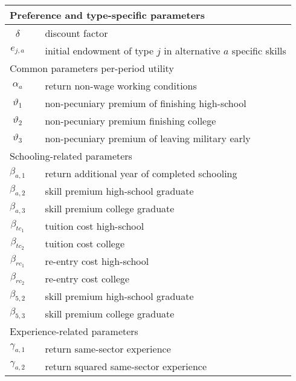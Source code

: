 \begin{ThreePartTable}
\begin{longtable}{@{}cll@{}}
\midrule
\multicolumn{3}{l}{Preference and type-specific parameters}																		 \\ \midrule 
$\delta$ 				&  & discount factor																			  \\
$e_{j, a}$			&  & initial endowment of type $j$ in alternative $a$ specific skills 	  \\ [7.5pt] \midrule 
\multicolumn{3}{l}{Common parameters per-period utility}												\\ \midrule 
$\alpha_a$           &  & return non-wage working conditions		   \\
$\vartheta_1$        &  & non-pecuniary premium of finishing high-school                 								    \\
$\vartheta_2$        &  & non-pecuniary premium finishing college															    \\
$\vartheta_3$        &  & non-pecuniary premium of leaving military early						  \\[7.5pt] \midrule 
\multicolumn{3}{l}{Schooling-related parameters}															   \\ \midrule
$\beta_{a,1}$        &  & return additional year of completed schooling 								\\
$\beta_{a,2}$        &  & skill premium high-school graduate										      \\
$\beta_{a,3}$        &  & skill premium college graduate													   	\\
$\beta_{tc_1}$       &  & tuition cost high-school                      											\\
$\beta_{tc_2}$       &  & tuition cost college                          												\\
$\beta_{rc_1}$       &  & re-entry cost high-school                     										   \\
$\beta_{rc_2}$       &  & re-entry cost college                        												   \\
$\beta_{5,2}$        &  & skill premium high-school graduate            									\\
$\beta_{5,3}$        &  & skill premium college graduate                									     \\ [7.5pt] \midrule
\multicolumn{3}{l}{Experience-related parameters}           													 \\
\midrule 
$\gamma_{a,1}$       &  & return same-sector experience                 									 \\
$\gamma_{a,2}$       &  & return squared same-sector experience         								\\

\end{longtable}
\end{ThreePartTable}

